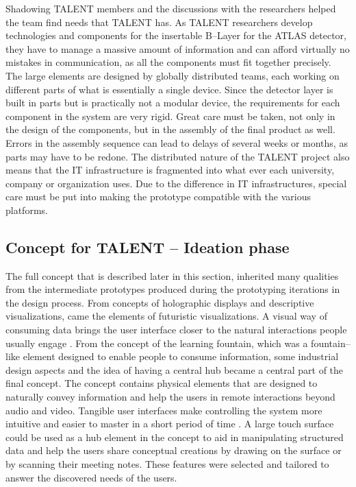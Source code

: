 \documentclass[english,12pt,a4paper,pdftex]{article}
\begin{document}
Shadowing TALENT members and the discussions with the researchers helped the team find needs that TALENT has. As TALENT researchers develop technologies and components for the insertable B--Layer for the ATLAS detector, they have to manage a massive amount of information and can afford virtually no mistakes in communication, as all the components must fit together precisely. The large elements are designed by globally distributed teams, each working on different parts of what is essentially a single device. Since the detector layer is built in parts but is practically not a modular device, the requirements for each component in the system are very rigid. Great care must be taken, not only in the design of the components, but in the assembly of the final product as well. Errors in the assembly sequence can lead to delays of several weeks or months, as parts may have to be redone. The distributed nature of the TALENT project also means that the IT infrastructure is fragmented into what ever each university, company or organization uses. Due to the difference in IT infrastructures, special care must be put into making the prototype compatible with the various platforms. 


\subsection{Concept for TALENT -- Ideation phase}


The full concept that is described later in this section, inherited many qualities from the intermediate prototypes produced during the prototyping iterations in the design process. From concepts of holographic displays and descriptive visualizations, came the elements of futuristic visualizations. A visual way of consuming data brings the user interface closer to the natural interactions people usually engage \cite{Underkoffler} \cite{Shaer}. From the concept of the learning fountain, which was a fountain--like element designed to enable people to consume information, some industrial design aspects and the idea of having a central hub became a central part of the final concept. The concept contains physical elements that are designed to naturally convey information and help the users in remote interactions beyond audio and video. Tangible user interfaces make controlling the system more intuitive and easier to master in a short period of time \cite{Shaer}. A large touch surface could be used as a hub element in the concept to aid in manipulating structured data and help the users share conceptual creations by drawing on the surface or by scanning their meeting notes. These features were selected and tailored to answer the discovered needs of the users.
\end{document}
